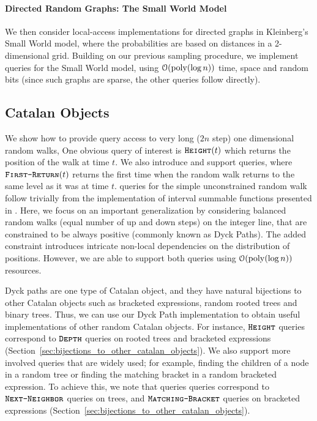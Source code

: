 \paragraph*{Directed Random Graphs: The Small World Model}
\label{par:directed_random_graphs}
We then consider local-access implementations for directed graphs in Kleinberg's Small World model,
where the probabilities are based on distances in a 2-dimensional grid.
Building on our previous sampling procedure, we implement  queries for the Small World model,
using $\mathcal{O}(\mathrm{poly}(\log n))$ time, space and random bits (since such graphs are sparse, the other queries follow directly).




\subsection{Catalan Objects}%
\label{sec:intro_catalan_objects}
We show how to provide query access to very long ($2n$ step) one dimensional random walks,
One obvious query of interest is $\texttt{\textsc{Height}}(t)$ which returns the position of the walk at time $t$.
We also introduce and support  queries, where $\texttt{\textsc{First-Return}}(t)$ returns
the first time when the random walk returns to the same level as it was at time $t$.
 queries for the simple unconstrained random walk
follow trivially from the implementation of interval summable functions presented in \cite{huge}.
Here, we focus on an important generalization by considering balanced random walks (equal number of up and down steps) on the integer line,
that are constrained to be always positive (commonly known as Dyck Paths).
The added constraint introduces intricate non-local dependencies on the distribution of positions.
However, we are able to support both queries using $\mathcal O(\mathrm{poly}(\log n))$ resources.

Dyck paths are one type of Catalan object, and they have natural bijections to other Catalan objects
such as bracketed expressions, random rooted trees and binary trees.
Thus, we can use our Dyck Path implementation to obtain useful implementations of other random Catalan objects.
For instance, $\texttt{\textsc{Height}}$ queries correspond to $\texttt{\textsc{Depth}}$ queries on rooted trees and bracketed expressions
(Section~\ref{sec:bijections_to_other_catalan_objects}).
We also support more involved queries that are widely used; for example, finding the children of a node in a random tree
or finding the matching bracket in a random bracketed expression.
To achieve this, we note that  queries queries correspond to $\texttt{\textsc{Next-Neighbor}}$ queries on trees,
and $\texttt{\textsc{Matching-Bracket}}$ queries on bracketed expressions (Section~\ref{sec:bijections_to_other_catalan_objects}).




